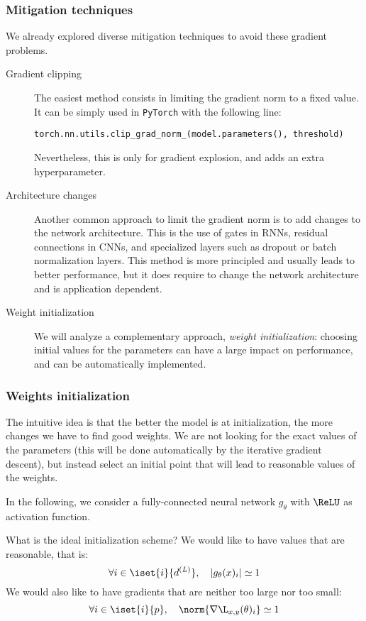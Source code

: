 \subsubsection{Mitigation techniques}
We already explored diverse mitigation techniques to avoid these gradient problems.

\begin{description}
    \item[Gradient clipping] The easiest method consists in limiting the gradient norm to a fixed value. It can be simply used in \texttt{PyTorch} with the following line:
    \begin{center}
        \texttt{torch.nn.utils.clip_grad_norm_(model.parameters(), threshold)}
    \end{center}
    Nevertheless, this is only for gradient explosion, and adds an extra hyperparameter.
    \item[Architecture changes] Another common approach to limit the gradient norm is to add changes to the network architecture. This is the use of gates in RNNs, residual connections in CNNs, and specialized layers such as dropout or batch normalization layers. This method is more principled and usually leads to better performance, but it does require to change the network architecture and is application dependent.
    \item[Weight initialization] We will analyze a complementary approach, \emph{weight initialization}: choosing  initial values for the parameters can have a large impact on performance, and can be automatically implemented.
\end{description}

\subsubsection{Weights initialization}
The intuitive idea is that the better the model is at initialization, the more changes we have to find good weights. We are not looking for the exact values of the parameters (this will be done automatically by the iterative gradient descent), but instead select an initial point that will lead to reasonable values of the weights.

In the following, we consider a fully-connected neural network $g_\theta$ with $\ReLU$ as activation function.

What is the ideal initialization scheme? We would like to have values that are reasonable, that is:
\begin{equation*}
    \forall i\in\iset{i}{d^{(L)}}, \quad |g_\theta(x)_i| \simeq 1
\end{equation*}
We would also like to have gradients that are neither too large nor too small:
\begin{equation*}
    \forall i\in\iset{i}{p}, \quad \norm{\nabla\L_{x,y}(\theta)_i}\simeq 1
\end{equation*}

